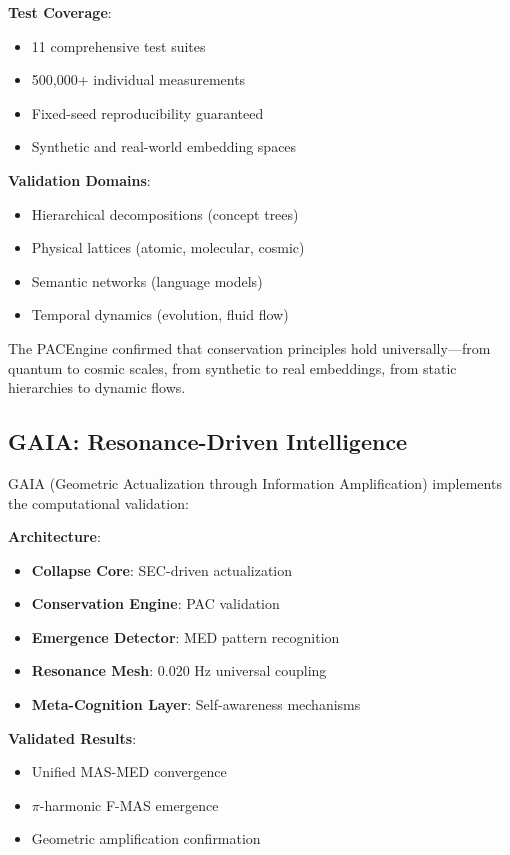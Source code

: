 \documentclass[11pt,a4paper]{article}
\begin{document}
\textbf{Test Coverage}:
\begin{itemize}
    \item 11 comprehensive test suites
    \item 500,000+ individual measurements
    \item Fixed-seed reproducibility guaranteed
    \item Synthetic and real-world embedding spaces
\end{itemize}

\textbf{Validation Domains}:
\begin{itemize}
    \item Hierarchical decompositions (concept trees)
    \item Physical lattices (atomic, molecular, cosmic)
    \item Semantic networks (language models)
    \item Temporal dynamics (evolution, fluid flow)
\end{itemize}

The PACEngine confirmed that conservation principles hold universally---from quantum to cosmic scales, from synthetic to real embeddings, from static hierarchies to dynamic flows.

\subsection{GAIA: Resonance-Driven Intelligence}

GAIA (Geometric Actualization through Information Amplification) implements the computational validation:

\textbf{Architecture}:
\begin{itemize}
    \item \textbf{Collapse Core}: SEC-driven actualization
    \item \textbf{Conservation Engine}: PAC validation
    \item \textbf{Emergence Detector}: MED pattern recognition
    \item \textbf{Resonance Mesh}: 0.020 Hz universal coupling
    \item \textbf{Meta-Cognition Layer}: Self-awareness mechanisms
\end{itemize}

\textbf{Validated Results}:
\begin{itemize}
    \item Unified MAS-MED convergence
    \item $\pi$-harmonic F-MAS emergence
    \item Geometric amplification confirmation
\end{itemize}
\end{document}
